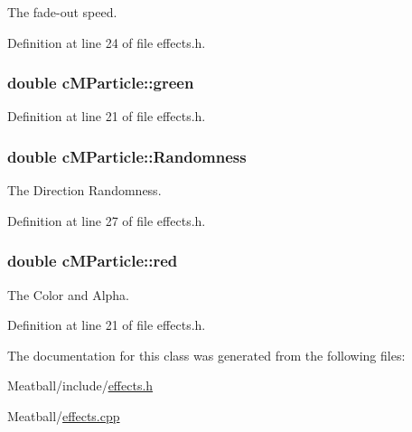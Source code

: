 The fade-\/out speed. 



Definition at line 24 of file effects.\-h.

\hypertarget{classc_m_particle_a7dc2ceeb185589e0f2184c966739455d}{
\subsubsection[{green}]{\setlength{\rightskip}{0pt plus 5cm}double c\-M\-Particle\-::green}}\label{classc_m_particle_a7dc2ceeb185589e0f2184c966739455d}


Definition at line 21 of file effects.\-h.

\hypertarget{classc_m_particle_a6df51f38f42317961cbdd55dca8f20fa}{
\subsubsection[{Randomness}]{\setlength{\rightskip}{0pt plus 5cm}double c\-M\-Particle\-::\-Randomness}}\label{classc_m_particle_a6df51f38f42317961cbdd55dca8f20fa}


The Direction Randomness. 



Definition at line 27 of file effects.\-h.

\hypertarget{classc_m_particle_ad88df0d1dc8eb30154ccb48de8be4e72}{
\subsubsection[{red}]{\setlength{\rightskip}{0pt plus 5cm}double c\-M\-Particle\-::red}}\label{classc_m_particle_ad88df0d1dc8eb30154ccb48de8be4e72}


The Color and Alpha. 



Definition at line 21 of file effects.\-h.



The documentation for this class was generated from the following files\-:\begin{DoxyCompactItemize}
\item 
Meatball/include/\hyperlink{effects_8h}{effects.\-h}\item 
Meatball/\hyperlink{effects_8cpp}{effects.\-cpp}\end{DoxyCompactItemize}
